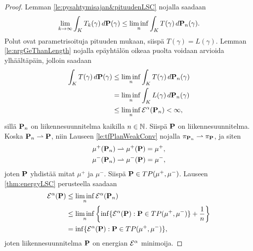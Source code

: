 \documentclass[12pt,oneside,a4paper]{amsbook} %
\begin{document}
\begin{proof}
    Lemman \ref{le:pysahtymisajan&pituudenLSC} nojalla saadaan
    \begin{equation*}
       \lim_{k\to \infty}\int_K T_k(\gamma)\, d\P(\gamma)  \le \liminf_n \int_K T(\gamma) \, d\P_n(\gamma).
    \end{equation*}
    Polut ovat parametrisoituja pituuden mukaan, siispä {$T(\gamma) = L(\gamma)$}. Lemman \ref{le:nrgGeThanLength} nojalla epäyhtälön oikeaa puolta voidaan arvioida ylhäältäpäin, jolloin saadaan
    \begin{align*}
        \int_K T(\gamma) \, d\P(\gamma) &\le \liminf_n \int_K T(\gamma) \, d\P_n(\gamma) \\
        & = \liminf_n \int_K L(\gamma) \, d\P_n(\gamma) \\
        & \le \liminf_n \E^\alpha(\P_n) < \infty,
    \end{align*}
    sillä $\P_n$ on liikennesuunnitelma kaikilla $n \in \N$. Siispä $\P$ on liikennesuunnitelma. Koska $\P_n \rightharpoonup \P$, niin Lauseen \ref{le:tfPlanWeakConv} nojalla $\pi_{\P_n} \rightharpoonup \pi_{\P}$, ja siten
    \begin{align*}
        \mu^+(\P_n) &\rightharpoonup \mu^+(\P) = \mu^+, \\ \mu^-(\P_n) &\rightharpoonup \mu^-(\P) = \mu^-,
    \end{align*} 
    joten $\P$ yhdistää mitat $\mu^+$ ja $\mu^-$. Siispä $\P \in TP(\mu^+, \mu^-)$. Lauseen \ref{thm:energyLSC} perusteella saadaan
    \begin{align*}
        \E^\alpha(\P) &\le \liminf_n \E^\alpha (\P_n) \\
        &\le \liminf_n \left\{\inf\{\E^\alpha(\P): \P\in TP(\mu^+, \mu^-)\} + \frac{1}{n}\right\} \\
        &= \inf\{\E^\alpha(\P): \P\in TP(\mu^+, \mu^-)\},
    \end{align*}
    joten liikennesuunnitelma $\P$ on energian $\E^\alpha$ minimoija.
\end{proof}



\end{document}
